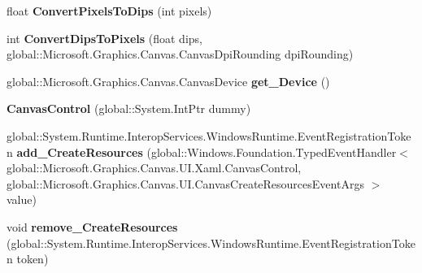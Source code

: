 \begin{DoxyCompactItemize}
float {\bfseries Convert\+Pixels\+To\+Dips} (int pixels)
\item 
\mbox{\label{class_microsoft_1_1_graphics_1_1_canvas_1_1_u_i_1_1_xaml_1_1_canvas_control_a6f9406f13bc216c0fe902d20beb8d936}} 
int {\bfseries Convert\+Dips\+To\+Pixels} (float dips, global\+::\+Microsoft.\+Graphics.\+Canvas.\+Canvas\+Dpi\+Rounding dpi\+Rounding)
\item 
\mbox{\label{class_microsoft_1_1_graphics_1_1_canvas_1_1_u_i_1_1_xaml_1_1_canvas_control_a53150d7d2beb847f94799b8c1be75e7a}} 
global\+::\+Microsoft.\+Graphics.\+Canvas.\+Canvas\+Device {\bfseries get\+\_\+\+Device} ()
\item 
\mbox{\label{class_microsoft_1_1_graphics_1_1_canvas_1_1_u_i_1_1_xaml_1_1_canvas_control_a31a6da4afc396ee8034865c568463129}} 
{\bfseries Canvas\+Control} (global\+::\+System.\+Int\+Ptr dummy)
\item 
\mbox{\label{class_microsoft_1_1_graphics_1_1_canvas_1_1_u_i_1_1_xaml_1_1_canvas_control_ab026eb60db1a9fa4336dcb1ac14e4fb4}} 
global\+::\+System.\+Runtime.\+Interop\+Services.\+Windows\+Runtime.\+Event\+Registration\+Token {\bfseries add\+\_\+\+Create\+Resources} (global\+::\+Windows.\+Foundation.\+Typed\+Event\+Handler$<$ global\+::\+Microsoft.\+Graphics.\+Canvas.\+U\+I.\+Xaml.\+Canvas\+Control, global\+::\+Microsoft.\+Graphics.\+Canvas.\+U\+I.\+Canvas\+Create\+Resources\+Event\+Args $>$ value)
\item 
\mbox{\label{class_microsoft_1_1_graphics_1_1_canvas_1_1_u_i_1_1_xaml_1_1_canvas_control_aee51056da35ed3fa259233ef54dda668}} 
void {\bfseries remove\+\_\+\+Create\+Resources} (global\+::\+System.\+Runtime.\+Interop\+Services.\+Windows\+Runtime.\+Event\+Registration\+Token token)
\item 
\mbox{\label{class_microsoft_1_1_graphics_1_1_canvas_1_1_u_i_1_1_xaml_1_1_canvas_control_a8c352fee2e45098d724d65a687a38126}} 

\end{DoxyCompactItemize}
